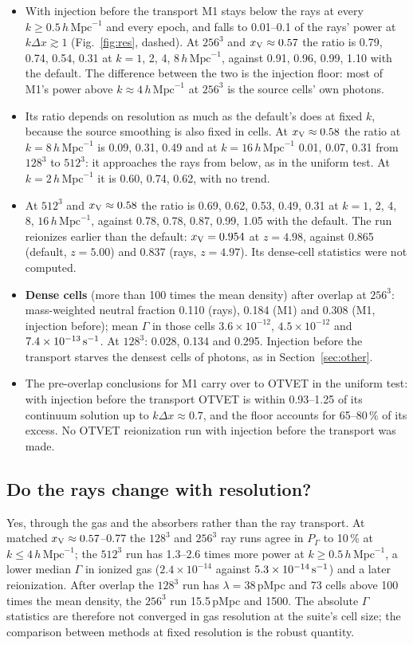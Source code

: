 \documentclass[11pt]{article}
\newcommand{\hmpc}{\,h\,\mathrm{Mpc}^{-1}}
\newcommand{\xv}{x_{\rm V}}
\newcommand{\dx}{\Delta x}
\begin{document}
\begin{itemize}
\item With injection before the transport M1 stays below the rays at every $k\ge0.5\hmpc$ and every epoch, and
falls to 0.01--0.1 of the rays' power at $k\dx\gtrsim1$ (Fig.~\ref{fig:res}, dashed). At $256^3$ and
$\xv\approx0.57$ the ratio is 0.79, 0.74, 0.54, 0.31 at $k=1$, 2, 4, $8\hmpc$, against 0.91, 0.96, 0.99, 1.10 with
the default. The difference between the two is the injection floor: most of M1's power above $k\approx4\hmpc$ at
$256^3$ is the source cells' own photons.
\item Its ratio depends on resolution as much as the default's does at fixed $k$, because the source smoothing is
also fixed in cells. At $\xv\approx0.58$ the ratio at $k=8\hmpc$ is 0.09, 0.31, 0.49 and at $k=16\hmpc$ 0.01, 0.07,
0.31 from $128^3$ to $512^3$: it approaches the rays from below, as in the uniform test. At $k=2\hmpc$ it is
0.60, 0.74, 0.62, with no trend.
\item At $512^3$ and $\xv\approx0.58$ the ratio is 0.69, 0.62, 0.53, 0.49, 0.31 at $k=1$, 2, 4, 8, $16\hmpc$,
against 0.78, 0.78, 0.87, 0.99, 1.05 with the default. The run reionizes earlier than the default: $\xv=0.954$ at
$z=4.98$, against 0.865 (default, $z=5.00$) and 0.837 (rays, $z=4.97$). Its dense-cell statistics were not computed.
\item \textbf{Dense cells} (more than 100 times the mean density) after overlap at $256^3$: mass-weighted neutral
fraction 0.110 (rays), 0.184 (M1) and 0.308 (M1, injection before); mean $\Gamma$ in those cells $3.6\times10^{-12}$,
$4.5\times10^{-12}$ and $7.4\times10^{-13}\,{\rm s^{-1}}$. At $128^3$: 0.028, 0.134 and 0.295. Injection before the
transport starves the densest cells of photons, as in Section~\ref{sec:other}.
\item The pre-overlap conclusions for M1 carry over to OTVET in the uniform test: with injection before the
transport OTVET is within 0.93--1.25 of its continuum solution up to $k\dx\approx0.7$, and the floor accounts for 65--80\,\%
of its excess. No OTVET reionization run with injection before the transport was made.
\end{itemize}

\subsection{Do the rays change with resolution?}

Yes, through the gas and the absorbers rather than the ray transport. At matched $\xv\approx0.57$--0.77 the $128^3$
and $256^3$ ray runs agree in $P_\Gamma$ to 10\,\% at $k\le4\hmpc$; the $512^3$ run has 1.3--2.6 times more
power at $k\ge0.5\hmpc$, a lower median $\Gamma$ in ionized gas ($2.4\times10^{-14}$ against $5.3\times10^{-14}\,{\rm s^{-1}}$) and a
later reionization. After overlap the $128^3$ run has $\lambda=38$\,pMpc and 73 cells above 100 times the mean density,
the $256^3$ run 15.5\,pMpc and 1500. The absolute $\Gamma$ statistics are therefore not converged in gas
resolution at the suite's cell size; the comparison between methods at fixed resolution is the robust quantity.
\end{document}
